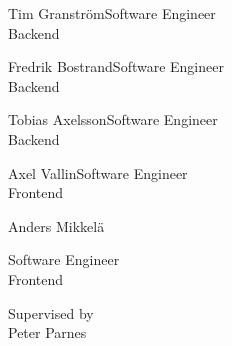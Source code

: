             {Tim Granström}{Software Engineer\\ Backend}

            {Fredrik Bostrand}{Software Engineer \\ Backend}

            {Tobias Axelsson}{Software Engineer \\ Backend}

            {Axel Vallin}{Software Engineer \\ Frontend}


\begin{center}
    \begin{member}
    \centering
    Anders Mikkelä\par
        Software Engineer \\
        Frontend
    \end{member}
\end{center}

\vfill

\begin{center}
    Supervised by\\ Peter Parnes
\end{center}
